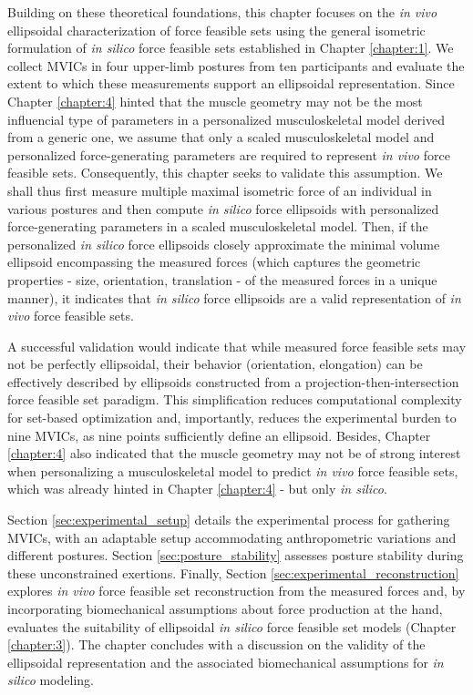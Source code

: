 Building on these theoretical foundations, this chapter focuses on the \emph{in vivo} ellipsoidal characterization of force feasible sets using the general isometric formulation of \emph{in silico} force feasible sets established in Chapter \ref{chapter:1}. We collect MVICs in four upper-limb postures from ten participants and evaluate the extent to which these measurements support an ellipsoidal representation. Since Chapter \ref{chapter:4} hinted that the muscle geometry may not be the most influencial type of parameters in a personalized musculoskeletal model derived from a generic one, we assume that only a scaled musculoskeletal model and personalized force-generating parameters are required to represent \emph{in vivo} force feasible sets. Consequently, this chapter seeks to validate this assumption. We shall thus first measure multiple maximal isometric force of an individual in various postures and then compute \emph{in silico} force ellipsoids with personalized force-generating parameters in a scaled musculoskeletal model. Then, if the personalized \emph{in silico} force ellipsoids closely approximate the minimal volume ellipsoid encompassing the measured forces (which captures the geometric properties - size, orientation, translation - of the measured forces in a unique manner), it indicates that \emph{in silico} force ellipsoids are a valid representation of \emph{in vivo} force feasible sets.

A successful validation would indicate that while measured force feasible sets may not be perfectly ellipsoidal, their behavior (orientation, elongation) can be effectively described by ellipsoids constructed from a projection-then-intersection force feasible set paradigm. This simplification reduces computational complexity for set-based optimization and, importantly, reduces the experimental burden to nine MVICs, as nine points sufficiently define an ellipsoid. Besides, Chapter \ref{chapter:4} also indicated that the muscle geometry may not be of strong interest when personalizing a musculoskeletal model to predict \emph{in vivo} force feasible sets, which was already hinted in Chapter \ref{chapter:4} - but only \emph{in silico}.

Section \ref{sec:experimental_setup} details the experimental process for gathering MVICs, with an adaptable setup accommodating anthropometric variations and different postures. Section \ref{sec:posture_stability} assesses posture stability during these unconstrained exertions. Finally, Section \ref{sec:experimental_reconstruction} explores \emph{in vivo} force feasible set reconstruction from the measured forces and, by incorporating biomechanical assumptions about force production at the hand, evaluates the suitability of ellipsoidal \emph{in silico} force feasible set models (Chapter \ref{chapter:3}). The chapter concludes with a discussion on the validity of the ellipsoidal representation and the associated biomechanical assumptions for \emph{in silico} modeling.


